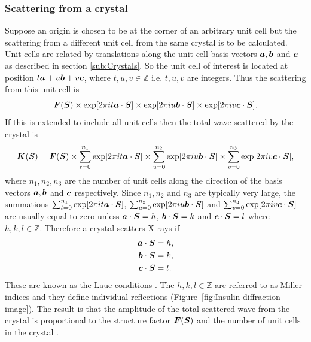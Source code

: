         \subsubsection{Scattering from a crystal}
        \label{subs:Scattering from a crystal}
            Suppose an origin is chosen to be at the corner of an arbitrary unit cell but the scattering from a different unit cell from the same crystal is to be calculated.
            Unit cells are related by translations along the unit cell basis vectors $\boldsymbol{a}, \boldsymbol{b}$ and  $\boldsymbol{c}$ as described in section \ref{sub:Crystals}.
            So the unit cell of interest is located at position $t\boldsymbol{a} + u\boldsymbol{b} + v\boldsymbol{c}$, where $t,u,v \in \mathbb{Z}$ i.e. $t,u,v$ are integers.
            Thus the scattering from this unit cell is
            \begin{equation}
                \boldsymbol{F}(\boldsymbol{S}) \times \exp[2\pi i t\boldsymbol{a} \cdot \boldsymbol{S}] \times \exp[2\pi i u\boldsymbol{b} \cdot \boldsymbol{S}] \times \exp[2\pi i v\boldsymbol{c} \cdot \boldsymbol{S}].
            \end{equation}
            If this is extended to include all unit cells then the total wave scattered by the crystal is
            \begin{equation}
                \boldsymbol{K}(\boldsymbol{S}) = \boldsymbol{F}(\boldsymbol{S}) \times \sum_{t=0}^{n_1}\exp[2\pi i t\boldsymbol{a} \cdot \boldsymbol{S}] \times \sum_{u=0}^{n_2}\exp[2\pi i u\boldsymbol{b} \cdot \boldsymbol{S}] \times \sum_{v=0}^{n_3}\exp[2\pi i v\boldsymbol{c} \cdot \boldsymbol{S}],
            \end{equation}
            where $n_1, n_2, n_3$ are the number of unit cells along the direction of the basis vectors $\boldsymbol{a}, \boldsymbol{b}$ and $\boldsymbol{c}$ respectively.
            Since $n_1, n_2$ and $n_3$ are typically very large, the summations
            $\sum_{t=0}^{n_1}\exp[2\pi i t\boldsymbol{a} \cdot \boldsymbol{S}]$, $\sum_{u=0}^{n_2}\exp[2\pi i u\boldsymbol{b} \cdot \boldsymbol{S}]$ and $\sum_{v=0}^{n_3}\exp[2\pi i v\boldsymbol{c} \cdot \boldsymbol{S}]$
            are usually equal to zero unless $\boldsymbol{a} \cdot \boldsymbol{S} = h$, $\boldsymbol{b} \cdot \boldsymbol{S} = k$ and $\boldsymbol{c} \cdot \boldsymbol{S} = l$ where $h,k,l \in \mathbb{Z}$.
            Therefore a crystal scatters X-rays if
            \begin{subequations}
                \begin{align}
                    \boldsymbol{a} \cdot \boldsymbol{S} &= h, \\
                    \boldsymbol{b} \cdot \boldsymbol{S} &= k, \\
                    \boldsymbol{c} \cdot \boldsymbol{S} &= l.
                \end{align}
            \label{eq:Laue conditions}
            \end{subequations}
            These are known as the Laue conditions \cite{drenth1999}. The $h,k,l \in \mathbb{Z}$ are referred to as Miller indices and they define individual reflections (Figure~\ref{fig:Insulin diffraction image}). The result is that the amplitude of the total scattered wave from the crystal is proportional to the structure factor $\boldsymbol{F}(\boldsymbol{S})$ and the number of unit cells in the crystal \cite{drenth1999}.

